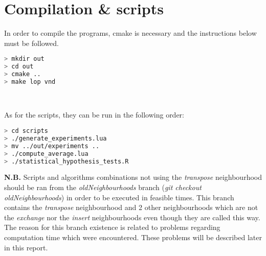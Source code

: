 \section{Compilation \& scripts}

\noindent In order to compile the programs, cmake is necessary and the instructions below
must be followed.

\begin{lstlisting}[language=bash]
> mkdir out
> cd out
> cmake ..
> make lop vnd
\end{lstlisting}
\

\noindent As for the scripts, they can be run in the following order:
\begin{lstlisting}[language=bash]
> cd scripts
> ./generate_experiments.lua
> mv ../out/experiments ..
> ./compute_average.lua
> ./statistical_hypothesis_tests.R
\end{lstlisting}

\begin{framehint}
    \textbf{N.B.} Scripts and algorithms combinations not using the \emph{transpose}
    neighbourhood should be ran from the \emph{oldNeighbourhoods} branch
    (\emph{git checkout oldNeighbourhoods}) in order to be executed in feasible
    times. This branch contains the \emph{transpose} neighbourhood and 2 other
    neighbourhoods which are not the \emph{exchange} nor the \emph{insert}
    neighbourhoods even though they are called this way.
    The reason for this branch existence is related to problems regarding
    computation time which were encountered. These problems will be described
    later in this report.
\end{framehint}

\newpage
